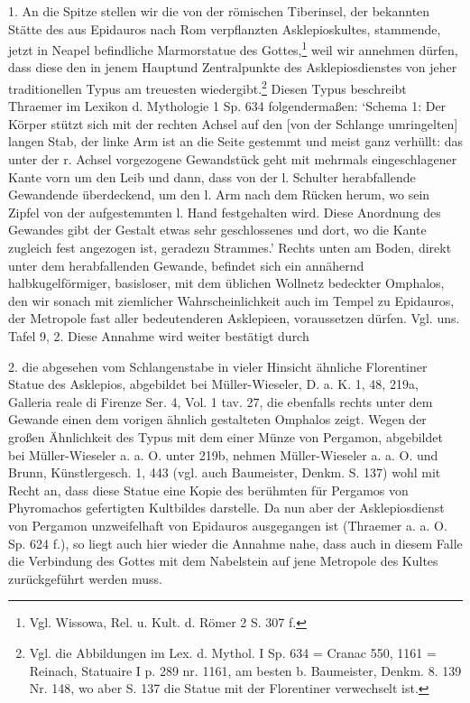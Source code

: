 \documentclass[a4paper, 11pt, oneside]{article}
\begin{document}
1. An die Spitze stellen wir die von der römischen Tiberinsel, der bekannten Stätte des aus Epidauros nach Rom verpflanzten Asklepioskultes, stammende, jetzt in Neapel befindliche Marmorstatue des Gottes,\footnote{Vgl. Wissowa, Rel. u. Kult. d. Römer 2 S. 307 f.} weil wir annehmen dürfen, dass diese den in jenem Hauptund Zentralpunkte des Asklepiosdienstes von jeher traditionellen Typus am treuesten wiedergibt.\footnote{Vgl. die Abbildungen im Lex. d. Mythol. I Sp. 634 = Cranac 550, 1161 = Reinach, Statuaire I p. 289 nr. 1161, am besten b. Baumeister, Denkm. 8. 139 Nr. 148, wo aber S. 137 die Statue mit der Florentiner verwechselt ist.} Diesen Typus beschreibt Thraemer im Lexikon d. Mythologie 1 Sp. 634 folgendermaßen: `Schema 1: Der Körper stützt sich mit der rechten Achsel auf den [von der Schlange umringelten] langen Stab, der linke Arm ist an die Seite gestemmt und meist ganz verhüllt: das unter der r. Achsel vorgezogene Gewandstück geht mit mehrmals eingeschlagener Kante vorn um den Leib und dann, dass von der l. Schulter herabfallende Gewandende überdeckend, um den l. Arm nach dem Rücken herum, wo sein Zipfel von der aufgestemmten l. Hand festgehalten wird. Diese Anordnung des Gewandes gibt der Gestalt etwas sehr geschlossenes und dort, wo die Kante zugleich fest angezogen ist, geradezu Strammes.' Rechts unten am Boden, direkt unter dem herabfallenden Gewande, befindet sich ein annähernd halbkugelförmiger, basisloser, mit dem üblichen Wollnetz bedeckter Omphalos, den wir sonach mit ziemlicher Wahrscheinlichkeit auch im Tempel zu Epidauros, der Metropole fast aller bedeutenderen Asklepieen, voraussetzen dürfen. Vgl. uns. Tafel 9, 2. Diese Annahme wird weiter bestätigt durch

2. die abgesehen vom Schlangenstabe in vieler Hinsicht ähnliche Florentiner Statue des Asklepios, abgebildet bei Müller-Wieseler, D. a. K. 1, 48, 219a, Galleria reale di Firenze Ser. 4, Vol. 1 tav. 27, die ebenfalls rechts unter dem Gewande einen dem vorigen ähnlich gestalteten Omphalos zeigt. Wegen der großen Ähnlichkeit des Typus mit dem einer Münze von Pergamon, abgebildet bei Müller-Wieseler a. a. O. unter 219b, nehmen Müller-Wieseler a. a. O. und Brunn, Künstlergesch. 1, 443 (vgl. auch Baumeister, Denkm. S. 137) wohl mit Recht an, dass diese Statue eine Kopie des berühmten für Pergamos von Phyromachos gefertigten Kultbildes darstelle. Da nun aber der Asklepiosdienst von Pergamon unzweifelhaft von Epidauros ausgegangen ist (Thraemer a. a. O. Sp. 624 f.), so liegt auch hier wieder die Annahme nahe, dass auch in diesem Falle die Verbindung des Gottes mit dem Nabelstein auf jene Metropole des Kultes zurückgeführt werden muss.
\end{document}
